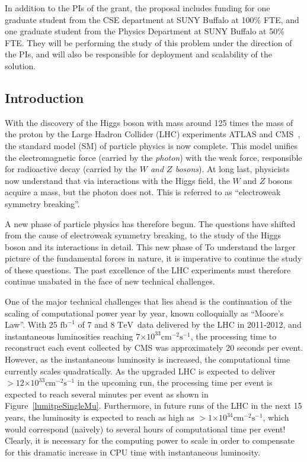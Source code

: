 \documentclass[12pt]{article}
\newcommand{\TeV}{\ensuremath{\mathrm{TeV}}}
\newcommand{\fbinv}        {\ensuremath{\mathrm{fb}^{-1}}}
\newcommand{\instlumiA}     {\ensuremath{\times 10^{33} \mathrm{cm}^{-2} \mathrm{s}^{-1}}}
\newcommand{\instlumiB}     {\ensuremath{\times 10^{34} \mathrm{cm}^{-2} \mathrm{s}^{-1}}}
\begin{document}
In addition to the PIs of the grant, the proposal includes funding for
one graduate student from the CSE department at SUNY Buffalo at 100\%
FTE, and one graduate student from the Physics Department at SUNY
Buffalo at 50\% FTE. They will be performing the study of this problem
under the direction of the PIs, and will also be responsible for
deployment and scalability of the solution. 



\subsection{Introduction}

With the discovery of the Higgs boson with mass around 
125 times the mass of the proton by the Large Hadron Collider (LHC)
experiments ATLAS and CMS~\cite{higgs_cms,higgs_atlas}, the
standard model (SM) of particle
physics is now complete. This model unifies the electromagnetic force
(carried by the {\em photon}) with the weak force, responsible for
radioactive decay (carried by the {\em $W$ and $Z$ bosons}).
At long last,
physicists now understand that via interactions with the Higgs field,
the $W$ and $Z$ bosons acquire a mass, but the photon does not. 
This is referred to as ``electroweak symmetry breaking''. 


A new phase of particle physics has therefore begun. 
The questions have shifted from the cause of electroweak symmetry
breaking, to the study of the Higgs boson and its interactions in
detail. This new phase of 
To understand the larger picture of the fundamental forces in nature,
it is imperative to continue the study of these questions. 
The past excellence of the LHC experiments must therefore continue
unabated in the face of new technical challenges. 


One of the major technical challenges that lies ahead is the
continuation of the scaling of computational power year by year, known
colloquially as ``Moore's Law''. 
With 25 $\fbinv$ of 7 and 8 \TeV\ data delivered by the LHC in
2011-2012, and instantaneous luminosities reaching
$7\instlumiA$, the processing
time to reconstruct each event collected by CMS was approximately 20
seconds per event. However, as the instantaneous luminosity is
increased, the computational time currently scales quadratically. As
the upgraded LHC is expected to deliver $>12\instlumiA$ in the
upcoming run, the processing time per event is expected to reach
several minutes per event as shown in
Figure~\ref{lumitpeSingleMu}. Furthermore, in future runs of the LHC
in the next 15 years, the luminosity is expected to reach as high as
$>1\instlumiB$, which would correspond (naively) to several hours of
computational time per event! Clearly, it is necessary for the
computing power to scale in order to compensate for this dramatic
increase in CPU time with instantaneous luminosity. 
\end{document}
